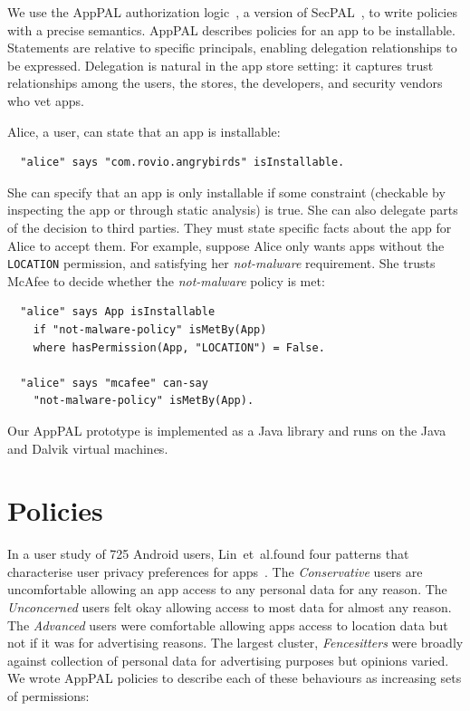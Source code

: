 \documentclass[]{soups-poster}
\makeatletter
\newcommand{\etal}[0]{et~al.\@ }
\newcommand{\citep}[1]{\cite{#1}}
\makeatother
\begin{document}
We use the AppPAL authorization logic~\citep{Hallett:2014un}, a version of SecPAL~\citep{Becker:2006vh}, to write policies with a precise semantics.
AppPAL describes policies for an app to be installable.
Statements are relative to specific principals, enabling delegation relationships to be expressed.
Delegation is natural in the app store setting: it captures trust relationships among the users, the stores, the developers, and security vendors who vet apps.

Alice, a user, can state that an app is installable:
\begin{lstlisting}
  "alice" says "com.rovio.angrybirds" isInstallable.
\end{lstlisting}
She can specify that an app is only installable if some constraint (checkable by inspecting the app or through static analysis) is true.
She can also delegate parts of the decision to third parties.
They must state specific facts about the app for Alice to accept them.
For example, suppose Alice only wants apps without the \texttt{LOCATION} permission,
and satisfying her \emph{not-malware} requirement.
She trusts McAfee to decide whether the \emph{not-malware} policy is met:
\begin{lstlisting}
  "alice" says App isInstallable
    if "not-malware-policy" isMetBy(App)
    where hasPermission(App, "LOCATION") = False.

  "alice" says "mcafee" can-say
    "not-malware-policy" isMetBy(App).
\end{lstlisting}

Our AppPAL prototype is implemented as a Java library and runs on the
Java and Dalvik virtual machines.
\vfill

\section{Policies}

In a user study of 725 Android users, Lin~\etal found four patterns that characterise user privacy preferences for apps~\citep{Sadeh:2014vq}.
The \emph{Conservative} users are uncomfortable allowing an app access to any personal data for any reason.
The \emph{Unconcerned} users felt okay allowing access to most data for almost any reason.
The \emph{Advanced} users were comfortable allowing apps access to location data but not if it was for advertising reasons.
The largest cluster, \emph{Fencesitters} were broadly against collection of personal data for advertising purposes but opinions varied.
We wrote AppPAL policies to describe each of these behaviours as
increasing sets of permissions:
\end{document}
